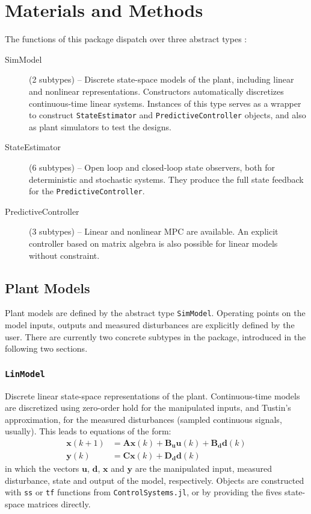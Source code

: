 
\section{Materials and Methods}

The functions of this package dispatch over three abstract types :
\begin{description}
    \item[SimModel] (2 subtypes) -- Discrete state-space models of the plant, including linear and nonlinear representations. Constructors automatically discretizes 
    continuous-time linear systems. Instances of this type serves as a wrapper to construct \texttt{StateEstimator} and \texttt{PredictiveController} objects, and also as plant simulators to test the designs.
    \item[StateEstimator] (6 subtypes) -- Open loop and closed-loop state observers, both for deterministic and stochastic systems. They produce the full state feedback for the \texttt{PredictiveController}.
    \item[PredictiveController] (3 subtypes) -- Linear and nonlinear MPC are available. An explicit controller based on matrix algebra is also possible for linear models without constraint.
\end{description}

\subsection{Plant Models}

Plant models are defined by the abstract type \texttt{SimModel}. Operating points on the model inputs, outputs and measured disturbances are explicitly defined by the user. There are currently two concrete subtypes in the package, introduced in the following two sections.

\subsubsection{\textnormal{\texttt{LinModel}}}

Discrete linear state-space representations of the plant. Continuous-time models are discretized using zero-order hold for the manipulated inputs, and Tustin's approximation, for the measured disturbances (sampled continuous signals, usually). This leads to equations of the form:
\begin{subequations}
\begin{align}
    \mathbf{x}(k+1) &= \mathbf{A x}(k) + \mathbf{B_u u}(k) + \mathbf{B_d d}(k) \\
    \mathbf{y}(k)   &= \mathbf{C x}(k) + \mathbf{D_d d}(k)
\end{align}
\end{subequations}
in which the vectors $\mathbf{u}$, $\mathbf{d}$, $\mathbf{x}$ and $\mathbf{y}$ are the manipulated input, measured disturbance, state and output of the model, respectively. Objects are constructed with \texttt{ss} or \texttt{tf} functions from \texttt{ControlSystems.jl}, or by providing the fives state-space matrices directly.


